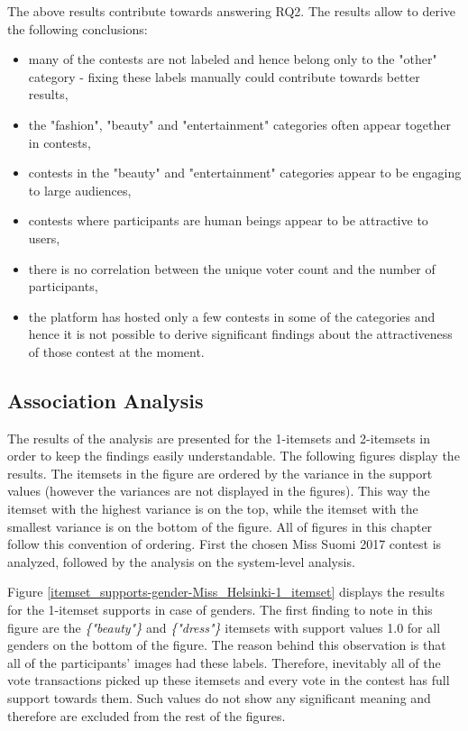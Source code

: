     The above results contribute towards answering RQ2. The results allow to derive the following conclusions: 

    \begin{itemize}
        \item many of the contests are not labeled and hence belong only to the "other" category - fixing these labels manually could contribute towards better results,
        \item the "fashion", "beauty" and "entertainment" categories often appear together in contests,
        \item contests in the "beauty" and "entertainment" categories appear to be engaging to large audiences,
        \item contests where participants are human beings appear to be attractive to users,
        \item there is no correlation between the unique voter count and the number of participants,
        \item the platform has hosted only a few contests in some of the categories and hence it is not possible to derive significant findings about the attractiveness of those contest at the moment.
    \end{itemize}

\subsection{Association Analysis}
The results of the analysis are presented for the 1-itemsets and 2-itemsets in order to keep the findings easily understandable. The following figures display the results. The itemsets in the figure are ordered by the variance in the support values (however the variances are not displayed in the figures). This way the itemset with the highest variance is on the top, while the itemset with the smallest variance is on the bottom of the figure. All of figures in this chapter follow this convention of ordering. First the chosen Miss Suomi 2017 contest is analyzed, followed by the analysis on the system-level analysis.

Figure \ref{itemset_supports-gender-Miss_Helsinki-1_itemset} displays the results for the 1-itemset supports in case of genders. The first finding to note in this figure are the \emph{\{"beauty"\}} and \emph{\{"dress"\}} itemsets with support values 1.0 for all genders on the bottom of the figure. The reason behind this observation is that all of the participants' images had these labels. Therefore, inevitably all of the vote transactions picked up these itemsets and every vote in the contest has full support towards them. Such values do not show any significant meaning and therefore are excluded from the rest of the figures.

